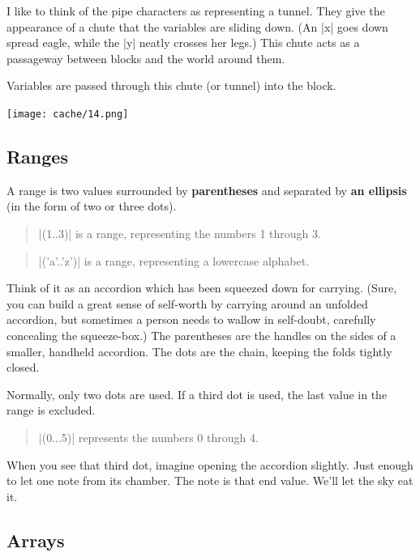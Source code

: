 \documentclass[12pt,twoside]{report}
\begin{document}
I like to think of the pipe characters as representing a tunnel.  They
give the appearance of a chute that the variables are sliding down.
(An \rubyinline|x| goes down spread eagle, while the
\rubyinline|y| neatly crosses her legs.)  This chute
acts as a passageway between blocks and the world around them.

Variables are passed through this chute (or tunnel) into the block.

	\hspace{5cm}\texttt{[image: cache/14.png]}




\subsection{Ranges}



A range is two values surrounded by {\bf parentheses} and separated by
{\bf an ellipsis} (in the form of two or three dots).

\begin{quote}
\rubyinline|(1..3)| is a range, representing the
numbers 1 through 3.\end{quote}


\begin{quote}
\rubyinline|('a'..'z')| is a range, representing a
lowercase alphabet.\end{quote}


Think of it as an accordion which has been squeezed down for carrying.
(Sure, you can build a great sense of self-worth by carrying around an
unfolded accordion, but sometimes a person needs to wallow in
self-doubt, carefully concealing the squeeze-box.)  The parentheses
are the handles on the sides of a smaller, handheld accordion.  The
dots are the chain, keeping the folds tightly closed.

Normally, only two dots are used.  If a third dot is used, the last
value in the range is excluded.

\begin{quote}
\rubyinline|(0...5)| represents the numbers 0 through
4.\end{quote}


When you see that third dot, imagine opening the accordion slightly.
Just enough to let one note from its chamber.  The note is that end
value.  We'll let the sky eat it.



\subsection{Arrays}
\end{document}

